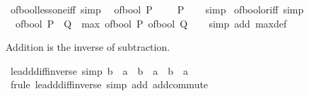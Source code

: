 \begin{isabellebody}
\ of{\isacharunderscore}{\kern0pt}bool{\isacharunderscore}{\kern0pt}less{\isacharunderscore}{\kern0pt}one{\isacharunderscore}{\kern0pt}iff\ {\isacharbrackleft}{\kern0pt}simp{\isacharbrackright}{\kern0pt}{\isacharcolon}{\kern0pt}\isanewline
\ \ {\isacartoucheopen}of{\isacharunderscore}{\kern0pt}bool\ P\ {\isacharless}{\kern0pt}\ {}\ {\isasymlongleftrightarrow}\ {\isasymnot}\ P{\isacartoucheclose}\isanewline
%
\isadelimproof
\ \ %
\endisadelimproof
%
\isatagproof
{}\isamarkupfalse%
\ simp%
\endisatagproof
{\isafoldproof}%
%
\isadelimproof
\isanewline
%
\endisadelimproof
\isanewline
{}\isamarkupfalse%
\ of{\isacharunderscore}{\kern0pt}bool{\isacharunderscore}{\kern0pt}or{\isacharunderscore}{\kern0pt}iff\ {\isacharbrackleft}{\kern0pt}simp{\isacharbrackright}{\kern0pt}{\isacharcolon}{\kern0pt}\isanewline
\ \ {\isacartoucheopen}of{\isacharunderscore}{\kern0pt}bool\ {\isacharparenleft}{\kern0pt}P\ {\isasymor}\ Q{\isacharparenright}{\kern0pt}\ {\isacharequal}{\kern0pt}\ max\ {\isacharparenleft}{\kern0pt}of{\isacharunderscore}{\kern0pt}bool\ P{\isacharparenright}{\kern0pt}\ {\isacharparenleft}{\kern0pt}of{\isacharunderscore}{\kern0pt}bool\ Q{\isacharparenright}{\kern0pt}{\isacartoucheclose}\isanewline
%
\isadelimproof
\ \ %
\endisadelimproof
%
\isatagproof
{}\isamarkupfalse%
\ {\isacharparenleft}{\kern0pt}simp\ add{\isacharcolon}{\kern0pt}\ max{\isacharunderscore}{\kern0pt}def{\isacharparenright}{\kern0pt}%
\endisatagproof
{\isafoldproof}%
%
\isadelimproof
%
\endisadelimproof
%
\begin{isamarkuptext}%
Addition is the inverse of subtraction.%
\end{isamarkuptext}\isamarkuptrue%
\isamarkupfalse%
\ le{\isacharunderscore}{\kern0pt}add{\isacharunderscore}{\kern0pt}diff{\isacharunderscore}{\kern0pt}inverse\ {\isacharbrackleft}{\kern0pt}simp{\isacharbrackright}{\kern0pt}{\isacharcolon}{\kern0pt}\ {\isachardoublequoteopen}b\ {\isasymle}\ a\ {\isasymLongrightarrow}\ b\ {\isacharplus}{\kern0pt}\ {\isacharparenleft}{\kern0pt}a\ {\isacharminus}{\kern0pt}\ b{\isacharparenright}{\kern0pt}\ {\isacharequal}{\kern0pt}\ a{\isachardoublequoteclose}\isanewline
%
\isadelimproof
\ \ %
\endisadelimproof
%
\isatagproof
{}\isamarkupfalse%
\ {\isacharparenleft}{\kern0pt}frule\ le{\isacharunderscore}{\kern0pt}add{\isacharunderscore}{\kern0pt}diff{\isacharunderscore}{\kern0pt}inverse{}{\isacharparenright}{\kern0pt}\ {\isacharparenleft}{\kern0pt}simp\ add{\isacharcolon}{\kern0pt}\ add{\isachardot}{\kern0pt}commute{\isacharparenright}{\kern0pt}%

\end{isabellebody}
